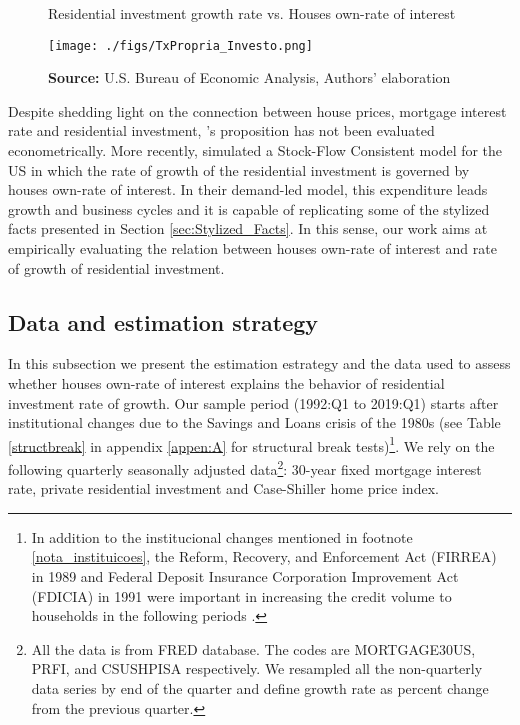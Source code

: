 \documentclass[12pt, a4paper]{article}
\begin{document}
\begin{figure}[htb]
	\centering
	\caption{Residential investment growth rate vs. Houses own-rate of interest}
	\label{propria_investo}
	\texttt{[image: ./figs/TxPropria\_Investo.png]}
	\caption*{\textbf{Source:} U.S. Bureau of Economic Analysis, Authors' elaboration}
\end{figure}

Despite shedding light on the connection between house prices, mortgage interest rate and residential investment, \citeauthor*{teixeira_crescimento_2015}'s \citeyear{teixeira_crescimento_2015} proposition has not been evaluated econometrically.
More recently, \textcite{petrini_2021_TD} simulated a Stock-Flow Consistent model for the US in which the rate of growth of the residential investment is governed by houses own-rate of interest.
In their demand-led model, this expenditure leads growth and business cycles and it is capable of replicating some of the stylized facts presented in Section \ref{sec:Stylized_Facts}.
In this sense, our work aims at empirically evaluating the relation between houses own-rate of interest and rate of growth of residential investment.


\subsection{Data and estimation strategy}
\label{sec:org3a35b5c}
\label{sec:estimation}

In this subsection we present the estimation estrategy and the data used to assess whether houses own-rate of interest explains the behavior of residential investment rate of growth.
Our sample period (1992:Q1 to 2019:Q1) starts after institutional changes due to the Savings and Loans crisis of the 1980s (see Table \ref{structbreak} in appendix \ref{appen:A} for structural break tests)\footnote{In addition to the institucional changes mentioned in footnote  \ref{nota_instituicoes}, the Reform, Recovery, and Enforcement Act (FIRREA) in 1989 and Federal Deposit Insurance Corporation Improvement Act (FDICIA) in 1991 were important in increasing the credit volume to households in the following periods \cite{wall_too_2010}.}.
We rely on the following  quarterly seasonally adjusted data\footnote{All the data is from FRED database. The codes are MORTGAGE30US, PRFI, and CSUSHPISA respectively. We resampled all the non-quarterly data series by end of the quarter and define growth rate as percent change from the previous quarter.}: 30-year fixed mortgage interest rate, private residential investment and Case-Shiller home price index.
\end{document}
